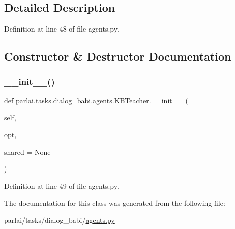 \subsection{Detailed Description}


Definition at line 48 of file agents.\+py.



\subsection{Constructor \& Destructor Documentation}
\mbox{\label{classparlai_1_1tasks_1_1dialog__babi_1_1agents_1_1KBTeacher_ac822ca7f017823413af0eebd531bee41}} 
\subsubsection{\texorpdfstring{\+\_\+\+\_\+init\+\_\+\+\_\+()}{\_\_init\_\_()}}
{\footnotesize\ttfamily def parlai.\+tasks.\+dialog\+\_\+babi.\+agents.\+K\+B\+Teacher.\+\_\+\+\_\+init\+\_\+\+\_\+ (\begin{DoxyParamCaption}\item[{}]{self,  }\item[{}]{opt,  }\item[{}]{shared = {\ttfamily None} }\end{DoxyParamCaption})}



Definition at line 49 of file agents.\+py.



The documentation for this class was generated from the following file\+:\begin{DoxyCompactItemize}
\item 
parlai/tasks/dialog\+\_\+babi/\hyperlink{parlai_2tasks_2dialog__babi_2agents_8py}{agents.\+py}\end{DoxyCompactItemize}
